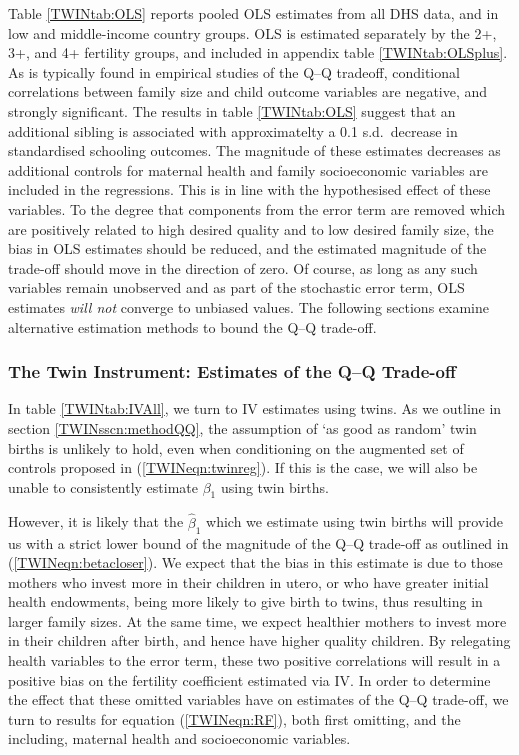 \documentclass[subeqn]{article}
\begin{document}
\begin{spacing}{1.4}
Table \ref{TWINtab:OLS} reports pooled OLS estimates from all DHS data, and in 
low and middle-income country groups. OLS is estimated separately by the 2+, 3+,
and 4+ fertility groups, and included in appendix table \ref{TWINtab:OLSplus}.
As is typically found in empirical studies of the Q--Q tradeoff, conditional 
correlations between family size and child outcome variables are negative, and 
strongly significant.  The results in table \ref{TWINtab:OLS} suggest that an 
additional sibling is associated with approximatelty a 0.1 s.d.\ decrease in 
standardised schooling outcomes.  The magnitude of these estimates decreases
as additional controls for maternal health and family socioeconomic variables
are included in the regressions. This is in line with the hypothesised effect
of these variables.  To the degree that components from the error term are 
removed which are positively related to high desired quality and to low desired 
family size, the bias in OLS estimates should be reduced, and the estimated 
magnitude of the trade-off should move in the direction of zero. Of course, as 
long as any such variables remain unobserved and as part of the stochastic error 
term, OLS estimates \emph{will not} converge to unbiased values.  The following 
sections examine alternative estimation methods to bound the Q--Q trade-off.

\subsubsection{The Twin Instrument: Estimates of the Q--Q Trade-off}
In table \ref{TWINtab:IVAll}, we turn to IV estimates using twins.  As we 
outline in section \ref{TWINsscn:methodQQ}, the assumption of `as good as 
random' twin births is unlikely to hold, even when conditioning on the augmented
set of controls proposed in (\ref{TWINeqn:twinreg}). If this is the case, we 
will also be unable to consistently estimate $\beta_1$ using twin births.

However, it is likely that the $\hat\beta_1$ which we estimate using twin births 
will provide us with a strict lower bound of the magnitude of the Q--Q trade-off 
as outlined in (\ref{TWINeqn:betacloser}). We expect that the bias in this 
estimate is due to those mothers who invest more in their children in utero, or 
who have greater initial health endowments, being more likely to give birth to 
twins, thus resulting in larger family sizes. At the same time, we expect 
healthier mothers to invest more in their children after birth, and hence have 
higher quality children. By relegating health variables to the error term, 
these two positive correlations will result in a positive bias on the fertility 
coefficient estimated via IV. In order to determine the effect that these 
omitted variables have on estimates of the Q--Q trade-off, we turn to results 
for equation (\ref{TWINeqn:RF}), both first omitting, and the including, 
maternal health and socioeconomic variables.


\end{spacing}
\end{document}
